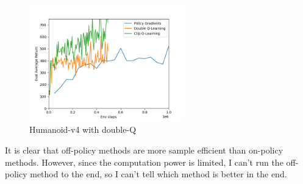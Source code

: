 \begin{itemize}
\MYSOLUTION 

\begin{figure}[H]
    \centering
    \includegraphics[width=0.6\textwidth]{../report/assets/3-1-5-3.png}
    \caption{Humanoid-v4 with double-Q}
    \label{fig:humanoid-v4-q}
\end{figure}

It is clear that off-policy methods are more sample efficient than on-policy methods. However, since the computation power is limited, I can't run the off-policy method to the end, so I can't tell which method is better in the end.
\end{itemize}